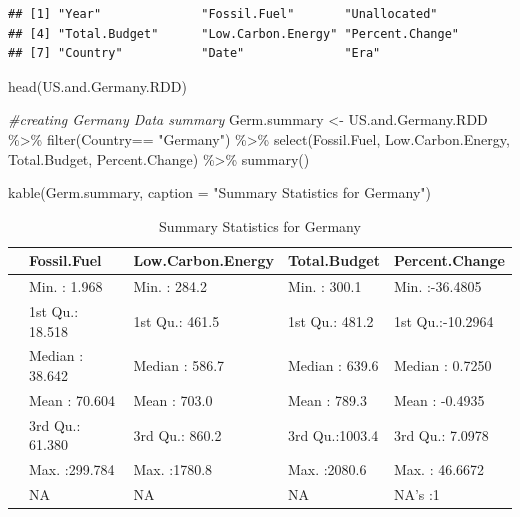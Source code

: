 \documentclass[
  12pt,
]{article}
\newenvironment{Shaded}{\begin{snugshade}}{\end{snugshade}}
\newcommand{\AttributeTok}[1]{\textcolor[rgb]{0.77,0.63,0.00}{#1}}
\newcommand{\CommentTok}[1]{\textcolor[rgb]{0.56,0.35,0.01}{\textit{#1}}}
\newcommand{\FunctionTok}[1]{\textcolor[rgb]{0.00,0.00,0.00}{#1}}
\newcommand{\NormalTok}[1]{#1}
\newcommand{\OtherTok}[1]{\textcolor[rgb]{0.56,0.35,0.01}{#1}}
\newcommand{\SpecialCharTok}[1]{\textcolor[rgb]{0.00,0.00,0.00}{#1}}
\newcommand{\StringTok}[1]{\textcolor[rgb]{0.31,0.60,0.02}{#1}}
\begin{document}
\begin{verbatim}
## [1] "Year"              "Fossil.Fuel"       "Unallocated"      
## [4] "Total.Budget"      "Low.Carbon.Energy" "Percent.Change"   
## [7] "Country"           "Date"              "Era"
\end{verbatim}

\begin{Shaded}
\begin{Highlighting}[]
\FunctionTok{head}\NormalTok{(US.and.Germany.RDD)}
\end{Highlighting}
\end{Shaded}

\begin{Shaded}
\begin{Highlighting}[]
\CommentTok{\#creating Germany Data summary}
\NormalTok{Germ.summary }\OtherTok{\textless{}{-}}\NormalTok{ US.and.Germany.RDD }\SpecialCharTok{\%\textgreater{}\%}
  \FunctionTok{filter}\NormalTok{(Country}\SpecialCharTok{==} \StringTok{"Germany"}\NormalTok{) }\SpecialCharTok{\%\textgreater{}\%}
  \FunctionTok{select}\NormalTok{(Fossil.Fuel, Low.Carbon.Energy, Total.Budget, Percent.Change) }\SpecialCharTok{\%\textgreater{}\%}
  \FunctionTok{summary}\NormalTok{()}

\FunctionTok{kable}\NormalTok{(Germ.summary, }\AttributeTok{caption =} \StringTok{"Summary Statistics for Germany"}\NormalTok{)}
\end{Highlighting}
\end{Shaded}

\begin{table}

\caption{\label{tab:calculating the summary statistics for US and Germany and creating tables}Summary Statistics for Germany}
\centering
\begin{tabular}[t]{l|l|l|l|l}
\hline
  &  Fossil.Fuel & Low.Carbon.Energy &  Total.Budget & Percent.Change\\
\hline
 & Min.   :  1.968 & Min.   : 284.2 & Min.   : 300.1 & Min.   :-36.4805\\
\hline
 & 1st Qu.: 18.518 & 1st Qu.: 461.5 & 1st Qu.: 481.2 & 1st Qu.:-10.2964\\
\hline
 & Median : 38.642 & Median : 586.7 & Median : 639.6 & Median :  0.7250\\
\hline
 & Mean   : 70.604 & Mean   : 703.0 & Mean   : 789.3 & Mean   : -0.4935\\
\hline
 & 3rd Qu.: 61.380 & 3rd Qu.: 860.2 & 3rd Qu.:1003.4 & 3rd Qu.:  7.0978\\
\hline
 & Max.   :299.784 & Max.   :1780.8 & Max.   :2080.6 & Max.   : 46.6672\\
\hline
 & NA & NA & NA & NA's   :1\\
\hline
\end{tabular}
\end{table}
\end{document}
